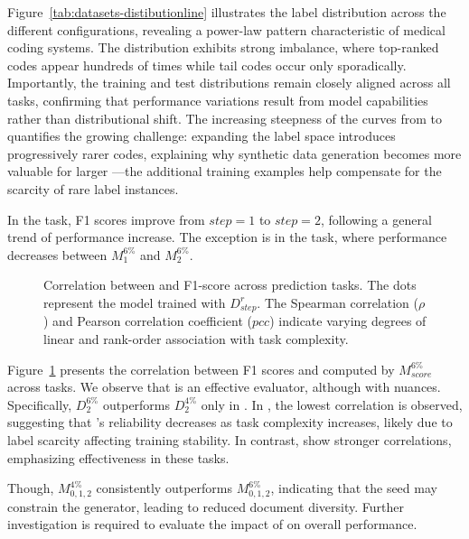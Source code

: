 Figure~\ref{tab:datasets-distibutionline} illustrates the label distribution across the different  configurations, revealing a power-law pattern characteristic of medical coding systems. The distribution exhibits strong imbalance, where top-ranked codes appear hundreds of times while tail codes occur only sporadically. Importantly, the training and test distributions remain closely aligned across all  tasks, confirming that performance variations result from model capabilities rather than distributional shift. The increasing steepness of the curves from  to  quantifies the growing challenge: expanding the label space introduces progressively rarer codes, explaining why synthetic data generation becomes more valuable for larger —the additional training examples help compensate for the scarcity of rare label instances.

In the  task, F1 scores improve from $step=1$ to $step=2$, following a general trend of performance increase. The exception is in the  task, where performance decreases between $M_{1}^{6\%}$ and $M_{2}^{6\%}$.

\begin{figure}[htb]
    \centering
    \resizebox{0.85\textwidth}{!}{}
    \caption{Correlation between \score and F1-score across  prediction tasks. The dots represent the model trained with $D_{step}^{r}$. The Spearman correlation ($\rho$) and Pearson correlation coefficient ($pcc$) indicate varying degrees of linear and rank-order association with task complexity.}
    \label{fig:correlation-f1-semscore}
\end{figure}

Figure~\ref{fig:correlation-f1-semscore} presents the correlation between F1 scores and \score computed by $M_{score}^{6\%}$ across  tasks. We observe that \score is an effective evaluator, although with nuances. Specifically, $D_{2}^{6\%}$ outperforms $D_{2}^{4\%}$ only in . In , the lowest correlation is observed, suggesting that \score's reliability decreases as task complexity increases, likely due to label scarcity affecting training stability. In contrast,  show stronger correlations, emphasizing \score effectiveness in these tasks.

Though, $M_{0,1,2}^{4\%}$ consistently outperforms $M_{0,1,2}^{6\%}$, indicating that the seed may constrain the generator, leading to reduced document diversity. Further investigation is required to evaluate the impact of \rsft on overall performance.

